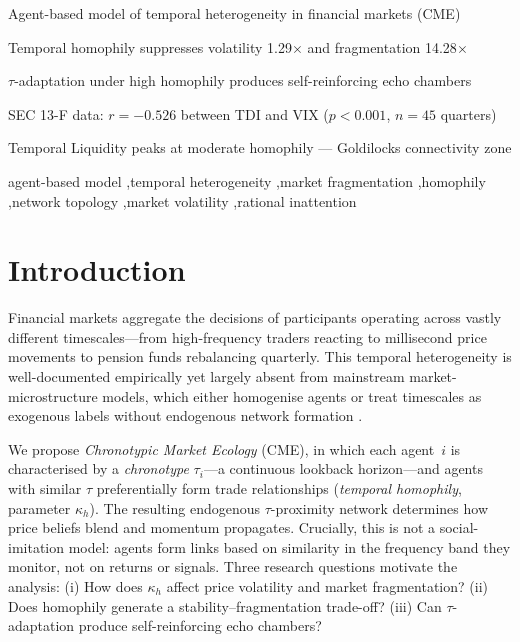 \documentclass[preprint,12pt,authoryear]{elsarticle}
\begin{document}
\begin{frontmatter}
\begin{highlights}
\item Agent-based model of temporal heterogeneity in financial markets (CME)
\item Temporal homophily suppresses volatility 1.29$\times$ and fragmentation 14.28$\times$
\item $\tau$-adaptation under high homophily produces self-reinforcing echo chambers
\item SEC 13-F data: $r = -0.526$ between TDI and VIX ($p<0.001$, $n=45$ quarters)
\item Temporal Liquidity peaks at moderate homophily --- Goldilocks connectivity zone
\end{highlights}

\begin{keyword}
agent-based model \sep temporal heterogeneity \sep market fragmentation
\sep homophily \sep network topology \sep market volatility
\sep rational inattention
\end{keyword}

\end{frontmatter}

\section{Introduction}
\label{sec:intro}

Financial markets aggregate the decisions of participants operating across
vastly different timescales---from high-frequency traders reacting to
millisecond price movements to pension funds rebalancing quarterly.
This temporal heterogeneity is well-documented empirically
\citep{muller1993, corsi2009} yet largely absent from mainstream
market-microstructure models, which either homogenise agents or treat
timescales as exogenous labels without endogenous network formation
\citep{lebaron2001, farmerfoley2009}.

We propose \emph{Chronotypic Market Ecology} (CME), in which each agent~$i$
is characterised by a \emph{chronotype} $\tau_i$---a continuous lookback
horizon---and agents with similar $\tau$ preferentially form trade
relationships (\emph{temporal homophily}, parameter $\kappa_h$).
The resulting endogenous $\tau$-proximity network determines how price
beliefs blend and momentum propagates.
Crucially, this is not a social-imitation model: agents form links
based on similarity in the frequency band they monitor, not on returns or
signals.
Three research questions motivate the analysis: (i) How does $\kappa_h$
affect price volatility and market fragmentation? (ii) Does homophily
generate a stability--fragmentation trade-off? (iii) Can $\tau$-adaptation
produce self-reinforcing echo chambers?
\end{document}
